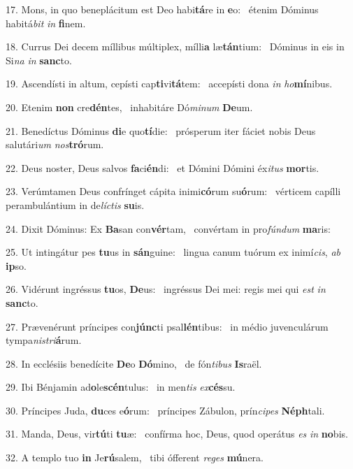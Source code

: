 17. Mons, in quo beneplácitum est Deo habi\textbf{tá}re in \textbf{e}o: \ast\  étenim Dóminus habitá\textit{bit} \textit{in} \textbf{fi}nem.\

18. Currus Dei decem míllibus múltiplex, mílli\textbf{a} læ\textbf{tán}tium: \ast\  Dóminus in eis in Si\textit{na} \textit{in} \textbf{sanc}to.\

19. Ascendísti in altum, cepísti cap\textbf{ti}vi\textbf{tá}tem: \ast\  accepísti dona \textit{in} \textit{ho}\textbf{mí}nibus.\

20. Etenim \textbf{non} cre\textbf{dén}tes, \ast\  inhabitáre Dó\textit{mi}\textit{num} \textbf{De}um.\

21. Benedíctus Dóminus \textbf{di}e quo\textbf{tí}die: \ast\  prósperum iter fáciet nobis Deus salutári\textit{um} \textit{nos}\textbf{tró}rum.\

22. Deus noster, Deus salvos \textbf{fa}ci\textbf{én}di: \ast\  et Dómini Dómini éx\textit{i}\textit{tus} \textbf{mor}tis.\

23. Verúmtamen Deus confrínget cápita inimi\textbf{có}rum su\textbf{ó}rum: \ast\  vérticem capílli perambulántium in de\textit{líc}\textit{tis} \textbf{su}is.\

24. Dixit Dóminus: Ex \textbf{Ba}san con\textbf{vér}tam, \ast\  convértam in pro\textit{fún}\textit{dum} \textbf{ma}ris:\

25. Ut intingátur pes \textbf{tu}us in \textbf{sán}guine: \ast\  lingua canum tuórum ex inimí\textit{cis}, \textit{ab} \textbf{ip}so.\

26. Vidérunt ingréssus \textbf{tu}os, \textbf{De}us: \ast\  ingréssus Dei mei: regis mei qui \textit{est} \textit{in} \textbf{sanc}to.\

27. Prævenérunt príncipes con\textbf{júnc}ti psal\textbf{lén}tibus: \ast\  in médio juvenculárum tympa\textit{nis}\textit{tri}\textbf{á}rum.\

28. In ecclésiis benedícite \textbf{De}o \textbf{Dó}mino, \ast\  de fón\textit{ti}\textit{bus} \textbf{Is}raël.\

29. Ibi Bénjamin ad\textbf{o}le\textbf{scén}tulus: \ast\  in men\textit{tis} \textit{ex}\textbf{cés}su.\

30. Príncipes Juda, \textbf{du}ces e\textbf{ó}rum: \ast\  príncipes Zábulon, prín\textit{ci}\textit{pes} \textbf{Néph}tali.\

31. Manda, Deus, vir\textbf{tú}ti \textbf{tu}æ: \ast\  confírma hoc, Deus, quod operátus \textit{es} \textit{in} \textbf{no}bis.\

32. A templo tuo \textbf{in} Je\textbf{rú}salem, \ast\  tibi ófferent \textit{re}\textit{ges} \textbf{mú}nera.\

